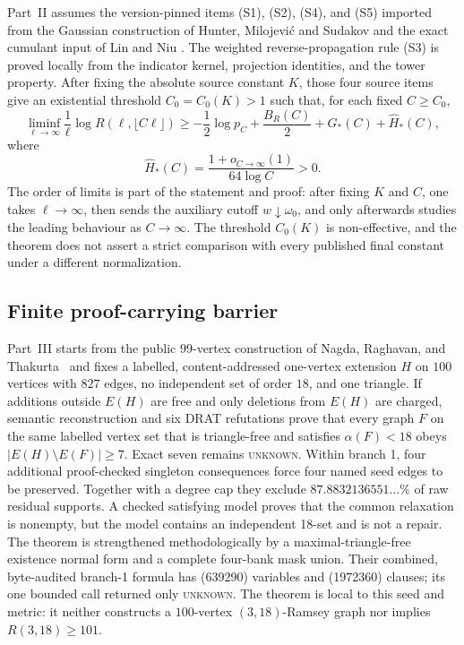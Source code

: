 Part~II assumes the version-pinned items (S1), (S2), (S4), and (S5) imported
from the Gaussian construction of Hunter, Milojevi\'c and Sudakov and the
exact cumulant input of Lin and Niu \cite{HMS2025,LinNiu2026}.  The weighted
reverse-propagation rule (S3) is proved locally from the indicator kernel,
projection identities, and the tower property.  After fixing the absolute
source constant $K$, those four source items give an existential threshold
$C_0=C_0(K)>1$ such that, for each fixed $C\ge C_0$,
\[
 \liminf_{\ell\to\infty}\frac1\ell
 \log R(\ell,\lfloor C\ell\rfloor)
 \ge -\frac12\log p_C+\frac{B_R(C)}2+G_*(C)+\widehat H_*(C),
\]
where
\[
 \widehat H_*(C)=\frac{1+o_{C\to\infty}(1)}{64\log C}>0.
\]
The order of limits is part of the statement and proof: after fixing $K$ and
$C$, one takes $\ell\to\infty$, then sends the auxiliary cutoff
$w\downarrow\omega_0$, and only afterwards studies the leading behaviour as
$C\to\infty$.  The threshold $C_0(K)$ is non-effective, and the theorem does
not assert a strict comparison with every published final constant under a
different normalization.

\subsection{Finite proof-carrying barrier}

Part~III starts from the public $99$-vertex construction of Nagda, Raghavan,
and Thakurta~\cite{NagdaRaghavanThakurta2026} and fixes a labelled,
content-addressed one-vertex extension $H$ on $100$ vertices with $827$
edges, no independent set of order $18$, and one triangle.  If
additions outside $E(H)$ are free and only deletions from $E(H)$ are
charged, semantic reconstruction and six DRAT refutations prove that every
graph $F$ on the same labelled vertex set that is triangle-free and satisfies
$\alpha(F)<18$ obeys $|E(H)\setminus E(F)|\ge7$.  Exact seven remains
\textsc{unknown}.  Within branch 1, four additional proof-checked singleton
consequences force four named seed edges to be preserved.  Together with a
degree cap they exclude $87.8832136551\ldots\%$ of raw residual supports.  A
checked satisfying model proves that the common relaxation is nonempty, but
the model contains an independent 18-set and is not a repair.  The theorem is
strengthened methodologically by a maximal-triangle-free existence normal form
and a complete four-bank mask union.  Their combined, byte-audited branch-1
formula has (639290) variables and (1972360) clauses; its one bounded call
returned only \textsc{unknown}.  The theorem is
local to this seed and metric: it neither constructs a $100$-vertex
$(3,18)$-Ramsey graph nor implies $R(3,18)\ge101$.

